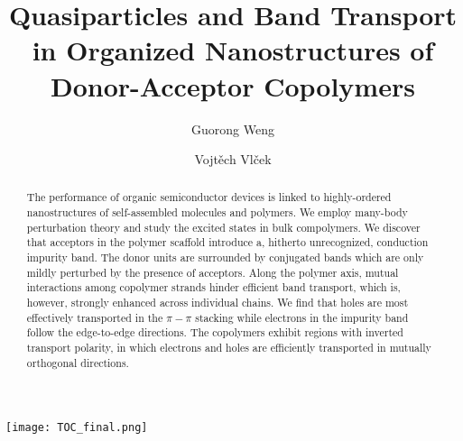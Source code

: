 \documentclass[journal = jpclcd]{achemso}
\author{Guorong Weng}
\author{Vojt\v{e}ch Vl\v{c}ek}
\affiliation{Department of Chemistry and Biochemistry, University of California, Santa Barbara, 93106, U.S.A}
\title{Quasiparticles and Band Transport in Organized Nanostructures of Donor-Acceptor Copolymers}
\begin{document}
\begin{tocentry}
    \centering
    \texttt{[image: TOC\_final.png]}
    \label{fig:TOCentry}
\end{tocentry}

\date{}
\maketitle




\begin{abstract}

The performance of organic semiconductor devices is linked to highly-ordered nanostructures of self-assembled molecules and polymers. We employ many-body perturbation theory and study the excited states in bulk compolymers. We discover that acceptors in the polymer scaffold introduce a, hitherto unrecognized, conduction impurity band. The donor units are surrounded by conjugated bands which are only mildly perturbed by the presence of acceptors. Along the polymer axis, mutual interactions among copolymer strands hinder efficient band transport, which is, however, strongly enhanced across individual chains. We find that holes are most effectively transported in the $\pi-\pi$ stacking while electrons in the impurity band follow the edge-to-edge directions. The copolymers exhibit regions with inverted transport polarity, in which electrons and holes are efficiently transported in mutually orthogonal directions.

\end{abstract}


\end{document}

